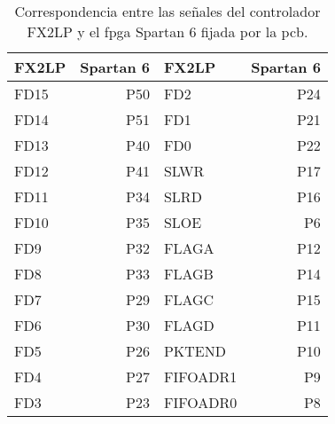 \begin{longtable}{|lr| |lr|}
	\hline
	\textbf{FX2LP} & \textbf{Spartan 6}&\textbf{FX2LP} & \textbf{Spartan 6} \\
	\hline
	\endhead
	\hline
	\caption{Correspondencia entre las señales del controlador FX2LP y el \acrshort{fpga} Spartan 6 fijada por la \acrshort{pcb}.}%
	\label{tab:fpga:conexion}
	\endlastfoot
	\hline
	\endfoot
	FD15 & P50 &FD2 & P24\\
	FD14 & P51 &FD1 & P21\\
	FD13 & P40 &FD0 & P22\\
	FD12 & P41 &SLWR & P17\\
	FD11 & P34 &SLRD & P16\\
	FD10 & P35 &SLOE & P6\\
	FD9 & P32 &FLAGA & P12\\
	FD8 & P33 &FLAGB & P14\\
	FD7 & P29 &FLAGC & P15\\
	FD6 & P30 &FLAGD & P11\\
	FD5 & P26 &PKTEND & P10\\
	FD4 & P27 &FIFOADR1 & P9\\
	FD3 & P23 &FIFOADR0 & P8\\
\end{longtable}

